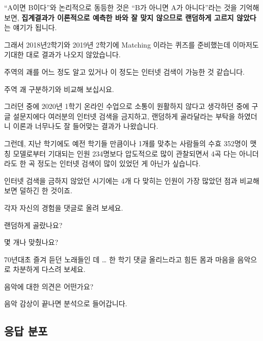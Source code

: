 \documentclass[
]{book}
\begin{document}
``A이면 B이다''와 논리적으로 동등한 것은 ``B가 아니면 A가 아니다''라는 것을 기억해 보면, \textbf{집계결과가 이론적으로 예측한 바와 잘 맞지 않으므로 랜덤하게 고르지 않았다}는 얘기가 됩니다.

그래서 2018년2학기와 2019년 2학기에 Matching 이라는 퀴즈를 준비했는데 이마저도 기대한 대로 결과가 나오지 않았습니다.

주역의 괘를 어느 정도 알고 있거나 이 정도는 인터넷 검색이 가능한 것 같습니다.

주역 괘 구분하기와 비교해 보십시요.

그러던 중에 2020년 1학기 온라인 수업으로 소통이 원활하지 않다고 생각하던 중에 구글 설문지에다 여러분의 인터넷 검색을 금지하고, 랜덤하게 골라달라는 부탁을 하였더니 이론과 너무나도 잘 들어맞는 결과가 나왔습니다.

그런데, 지난 학기에도 예전 학기들 만큼이나 1개를 맞추는 사람들의 수효 352명이 맷칭 모델로부터 기대되는 인원 234명보다 압도적으로 많이 관찰되면서 4곡 다는 아니더라도 한 곡 정도는 인터넷 검색이 많이 있었던 게 아닌가 싶습니다.

인터넷 검색을 금하지 않았던 시기에는 4개 다 맞히는 인원이 가장 많았던 점과 비교해 보면 덜하긴 한 것이죠.

각자 자신의 경험을 댓글로 올려 보세요.

랜덤하게 골랐나요?

몇 개나 맞췄나요?

70년대초 즐겨 듣던 노래들인 데 \ldots{} 한 학기 댓글 올리느라고 힘든 몸과 마음을 음악으로 차분하게 다스려 보세요.

음악에 대한 의견은 어떤가요?

음악 감상이 끝나면 분석으로 들어갑니다.

\subsection{응답 분포}\label{uxc751uxb2f5-uxbd84uxd3ec}
\end{document}
